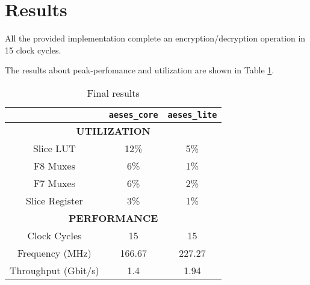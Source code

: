\section{Results}

All the provided implementation complete an encryption/decryption operation in 15
clock cycles.

The results about peak-perfomance and utilization are shown in Table \ref{tab:results}.

\begin{table}[h]

	\centering

  \caption{Final results}
  \label{tab:results}

  \begin{tabular}{| c | c | c |}
    \hline
	 & \texttt{aeses\_core} & \texttt{aeses\_lite} \\
	 \hline
	 \multicolumn{3}{c}{\textbf{UTILIZATION}}\\
	 \hline
	 Slice LUT & 12\% & 5\% \\
	 F8 Muxes & 6\% & 1\% \\
	 F7 Muxes & 6\% & 2\% \\
	 Slice Register & 3\% & 1\% \\
	 \hline
	 \multicolumn{3}{c}{\textbf{PERFORMANCE}}\\
	 \hline
	 Clock Cycles & 15 & 15 \\
	 Frequency (MHz) & 166.67 & 227.27 \\
	 Throughput (Gbit/s) & 1.4 & 1.94\\
	 \hline
	\end{tabular}

\end{table}

